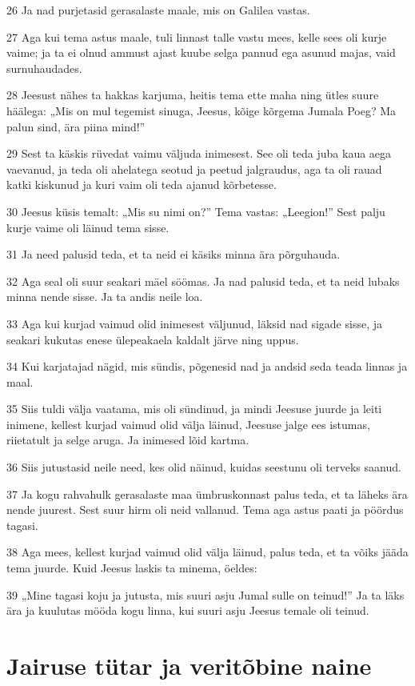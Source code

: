 \par 26 Ja nad purjetasid gerasalaste maale, mis on Galilea vastas.
\par 27 Aga kui tema astus maale, tuli linnast talle vastu mees, kelle sees oli kurje vaime; ja ta ei olnud ammust ajast kuube selga pannud ega asunud majas, vaid surnuhaudades.
\par 28 Jeesust nähes ta hakkas karjuma, heitis tema ette maha ning ütles suure häälega: „Mis on mul tegemist sinuga, Jeesus, kõige kõrgema Jumala Poeg? Ma palun sind, ära piina mind!”
\par 29 Sest ta käskis rüvedat vaimu väljuda inimesest. See oli teda juba kaua aega vaevanud, ja teda oli ahelatega seotud ja peetud jalgraudus, aga ta oli rauad katki kiskunud ja kuri vaim oli teda ajanud kõrbetesse.
\par 30 Jeesus küsis temalt: „Mis su nimi on?” Tema vastas: „Leegion!” Sest palju kurje vaime oli läinud tema sisse.
\par 31 Ja need palusid teda, et ta neid ei käsiks minna ära põrguhauda.
\par 32 Aga seal oli suur seakari mäel söömas. Ja nad palusid teda, et ta neid lubaks minna nende sisse. Ja ta andis neile loa.
\par 33 Aga kui kurjad vaimud olid inimesest väljunud, läksid nad sigade sisse, ja seakari kukutas enese ülepeakaela kaldalt järve ning uppus.
\par 34 Kui karjatajad nägid, mis sündis, põgenesid nad ja andsid seda teada linnas ja maal.
\par 35 Siis tuldi välja vaatama, mis oli sündinud, ja mindi Jeesuse juurde ja leiti inimene, kellest kurjad vaimud olid välja läinud, Jeesuse jalge ees istumas, riietatult ja selge aruga. Ja inimesed lõid kartma.
\par 36 Siis jutustasid neile need, kes olid näinud, kuidas seestunu oli terveks saanud.
\par 37 Ja kogu rahvahulk gerasalaste maa ümbruskonnast palus teda, et ta läheks ära nende juurest. Sest suur hirm oli neid vallanud. Tema aga astus paati ja pöördus tagasi.
\par 38 Aga mees, kellest kurjad vaimud olid välja läinud, palus teda, et ta võiks jääda tema juurde. Kuid Jeesus laskis ta minema, öeldes:
\par 39 „Mine tagasi koju ja jutusta, mis suuri asju Jumal sulle on teinud!” Ja ta läks ära ja kuulutas mööda kogu linna, kui suuri asju Jeesus temale oli teinud.

\section*{Jairuse tütar ja veritõbine naine}

